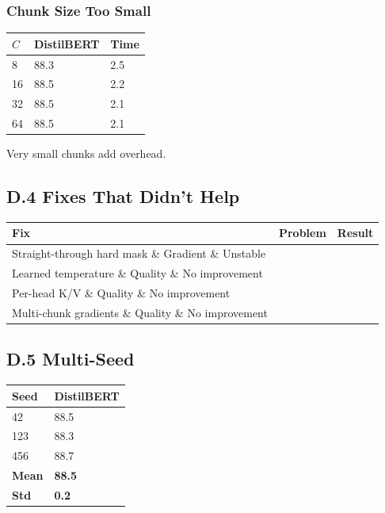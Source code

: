 \subsubsection{Chunk Size Too Small}
\begin{table}[H]
\centering
\small
\begin{tabular}{lll}
\toprule
\textbf{$C$} & \textbf{DistilBERT} & \textbf{Time} \\
\midrule
8 & 88.3 & 2.5 \\
16 & 88.5 & 2.2 \\
32 & 88.5 & 2.1 \\
64 & 88.5 & 2.1 \\
\bottomrule
\end{tabular}
\end{table}

Very small chunks add overhead.

\subsection{D.4 Fixes That Didn't Help}

\begin{table}[H]
\centering
\small
\begin{tabular}{lll}
\toprule
\textbf{Fix} & \textbf{Problem} & \textbf{Result} \\
\midrule
Straight-through hard mask \& Gradient \& Unstable \\
Learned temperature \& Quality \& No improvement \\
Per-head K/V \& Quality \& No improvement \\
Multi-chunk gradients \& Quality \& No improvement \\
\bottomrule
\end{tabular}
\end{table}

\subsection{D.5 Multi-Seed}

\begin{table}[H]
\centering
\small
\begin{tabular}{ll}
\toprule
\textbf{Seed} & \textbf{DistilBERT} \\
\midrule
42 & 88.5 \\
123 & 88.3 \\
456 & 88.7 \\
\textbf{Mean} & \textbf{88.5} \\
\textbf{Std} & \textbf{0.2} \\
\bottomrule
\end{tabular}
\end{table}

